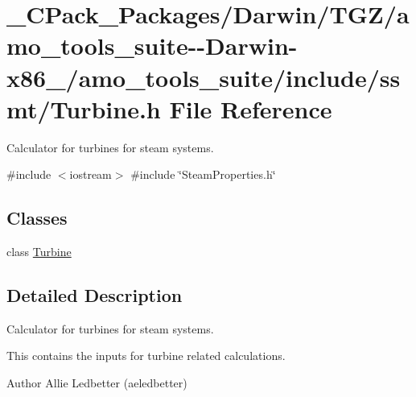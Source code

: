 \hypertarget{___c_pack___packages_2_darwin_2_t_g_z_2amo__tools__suite--_darwin-x86__64_2amo__tools__suite_2include_2ssmt_2_turbine_8h}{}\section{\+\_\+\+C\+Pack\+\_\+\+Packages/\+Darwin/\+T\+G\+Z/amo\+\_\+tools\+\_\+suite-\/-\/\+Darwin-\/x86\+\_/amo\+\_\+tools\+\_\+suite/include/ssmt/\+Turbine.h File Reference}
\label{___c_pack___packages_2_darwin_2_t_g_z_2amo__tools__suite--_darwin-x86__64_2amo__tools__suite_2include_2ssmt_2_turbine_8h}


Calculator for turbines for steam systems.  


{\ttfamily \#include $<$iostream$>$}\newline
{\ttfamily \#include \char`\"{}Steam\+Properties.\+h\char`\"{}}\newline
\subsection*{Classes}
\begin{DoxyCompactItemize}
\item 
class \hyperlink{class_turbine}{Turbine}
\end{DoxyCompactItemize}


\subsection{Detailed Description}
Calculator for turbines for steam systems. 

This contains the inputs for turbine related calculations.

\begin{DoxyAuthor}{Author}
Allie Ledbetter (aeledbetter) 
\end{DoxyAuthor}
